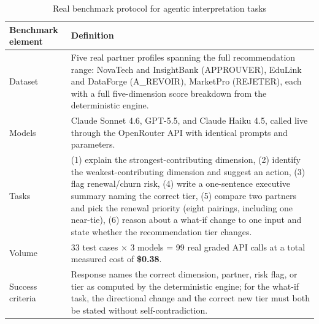\begin{table}[H]
  \centering
  \caption{Real benchmark protocol for agentic interpretation tasks}
  \label{tab:chapter7-benchmark-protocol}
  \begin{tabularx}{\linewidth}{>{\raggedright\arraybackslash}p{3.2cm}X}
    \toprule
    \textbf{Benchmark element} & \textbf{Definition} \\
    \midrule
    Dataset & Five real partner profiles spanning the full recommendation range: NovaTech and InsightBank (APPROUVER), EduLink and DataForge (A\_REVOIR), MarketPro (REJETER), each with a full five-dimension score breakdown from the deterministic engine. \\
    Models & Claude Sonnet 4.6, GPT-5.5, and Claude Haiku 4.5, called live through the OpenRouter API with identical prompts and parameters. \\
    Tasks & (1) explain the strongest-contributing dimension, (2) identify the weakest-contributing dimension and suggest an action, (3) flag renewal/churn risk, (4) write a one-sentence executive summary naming the correct tier, (5) compare two partners and pick the renewal priority (eight pairings, including one near-tie), (6) reason about a what-if change to one input and state whether the recommendation tier changes. \\
    Volume & 33 test cases $\times$ 3 models = 99 real graded API calls at a total measured cost of \textbf{\$0.38}. \\
    Success criteria & Response names the correct dimension, partner, risk flag, or tier as computed by the deterministic engine; for the what-if task, the directional change and the correct new tier must both be stated without self-contradiction. \\
    \bottomrule
  \end{tabularx}
\end{table}

